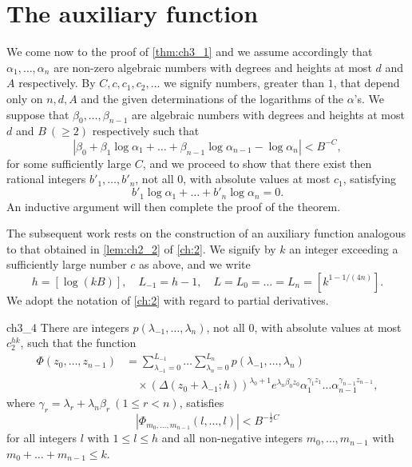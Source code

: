 \section{The auxiliary function}\label{sec:ch3_3}

We come now to the proof of \autoref{thm:ch3_1} and we assume accordingly that $\alpha_1, \dots, \alpha_n$ are non-zero algebraic numbers with degrees and heights at most $d$ and $A$ respectively. By $C, c, c_1, c_2, \dots$ we signify numbers, greater than $1$, that depend only on $n, d, A$ and the given determinations of the logarithms of the $\alpha$'s. We suppose that $\beta_0, \dots, \beta_{n-1}$ are algebraic numbers with degrees and heights at most $d$ and $B \ (\ge 2)$ respectively such that
\begin{equation} \label{eq:ch3_1}\tag{1}
|\beta_0 + \beta_1 \log \alpha_1 + \dots + \beta_{n-1} \log \alpha_{n-1} - \log \alpha_n| < B^{-C},
\end{equation}
for some sufficiently large $C$, and we proceed to show that there exist then rational integers $b'_1, \dots, b'_n$, not all $0$, with absolute values at most $c_1$, satisfying
\begin{equation} \label{eq:ch3_2}\tag{2}
b'_1 \log \alpha_1 + \dots + b'_n \log \alpha_n = 0.
\end{equation}
An inductive argument will then complete the proof of the theorem.

The subsequent work rests on the construction of an auxiliary function analogous to that obtained in \autoref{lem:ch2_2} of \autoref{ch:2}. We signify by $k$ an integer exceeding a sufficiently large number $c$ as above, and we write
\[
h = [\log (kB)], \quad L_{-1} = h-1, \quad L = L_0 = \dots = L_n = \left[k^{1-1/(4n)}\right].
\]
We adopt the notation of \autoref{ch:2} with regard to partial derivatives.

\begin{mylemma}{}{ch3_4}
There are integers $p(\lambda_{-1}, \dots, \lambda_n)$, not all $0$, with absolute values at most $c_2^{hk}$, such that the function
\begin{align*}
\Phi(z_0, \dots, z_{n-1}) &= \sum_{\lambda_{-1}=0}^{L_{-1}} \dots \sum_{\lambda_n=0}^{L_n} p(\lambda_{-1}, \dots, \lambda_n) \\
&\quad \times (\Delta(z_0 + \lambda_{-1}; h))^{\lambda_0 + 1} e^{\lambda_n \beta_0 z_0} \alpha_1^{\gamma_1 z_1} \dots \alpha_{n-1}^{\gamma_{n-1} z_{n-1}},
\end{align*}
where $\gamma_r = \lambda_r + \lambda_n \beta_r \ (1 \le r < n)$, satisfies
\begin{equation} \label{eq:ch3_3}\tag{3}
|\Phi_{m_0, \dots, m_{n-1}}(l, \dots, l)| < B^{-\frac{1}{2}C}
\end{equation}
for all integers $l$ with $1 \le l \le h$ and all non-negative integers $m_0, \dots, m_{n-1}$ with $m_0 + \dots + m_{n-1} \le k$.
\end{mylemma}

